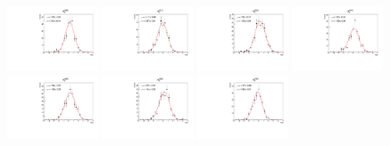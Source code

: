 \begin{figure}[h]\centering
    \includegraphics[width=0.24\textwidth]{figure/io_full_sim/polarization/pull_polarization_alpha0_4600.pdf}
    \includegraphics[width=0.24\textwidth]{figure/io_full_sim/polarization/pull_polarization_alpha0_4612.pdf}
    \includegraphics[width=0.24\textwidth]{figure/io_full_sim/polarization/pull_polarization_alpha0_4626.pdf}
    \includegraphics[width=0.24\textwidth]{figure/io_full_sim/polarization/pull_polarization_alpha0_4640.pdf}
    \includegraphics[width=0.24\textwidth]{figure/io_full_sim/polarization/pull_polarization_alpha0_4660.pdf}
    \includegraphics[width=0.24\textwidth]{figure/io_full_sim/polarization/pull_polarization_alpha0_4680.pdf}
    \includegraphics[width=0.24\textwidth]{figure/io_full_sim/polarization/pull_polarization_alpha0_4700.pdf}

\end{figure}
